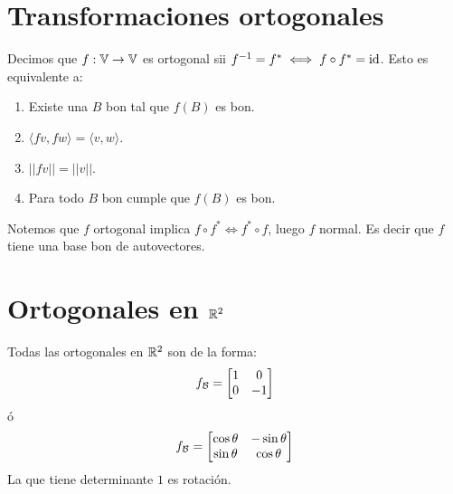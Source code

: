 \documentclass{article}
\begin{document}
\section*{Transformaciones ortogonales}
Decimos que $f : \mathbb{V} \to \mathbb{V}$ es ortogonal sii $f^{-1} = f^* \iff f\circ f^* = \operatorname{id}$. Esto es equivalente a:
\begin{enumerate}
    \item Existe una $B$ bon tal que $f(B)$ es bon.
    \item $\langle fv, fw \rangle = \langle v, w \rangle$.
    \item $||fv|| = ||v||$.
    \item Para todo $B$ bon cumple que $f(B)$ es bon.
\end{enumerate}

Notemos que $f$ ortogonal implica $f \circ f^* \iff f^* \circ f$, luego $f$ normal. Es decir que $f$ tiene una base bon de autovectores.

\section*{Ortogonales en $\mathbb{R}^2$}
Todas las ortogonales en $\mathbb{R}^2$ son de la forma:
\[
    f_{\mathcal{B}} =
\begin{bmatrix}
    1 & 0 \\
    0 & -1 \\
\end{bmatrix}
\]
ó
\[
    f_{\mathcal{B}} =
\begin{bmatrix}
    \cos \theta & -\sin \theta \\
    \sin \theta & \cos \theta \\
\end{bmatrix}
\]
La que tiene determinante $1$ es rotación.
\end{document}
